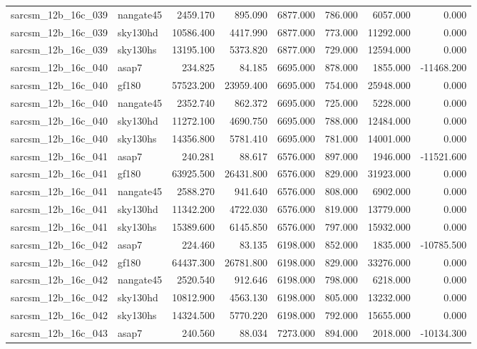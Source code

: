 \begin{tabular}{llrrrrrr}
sarcsm\_12b\_16c\_039 & nangate45 & 2459.170 & 895.090 & 6877.000 & 786.000 & 6057.000 & 0.000 \\
sarcsm\_12b\_16c\_039 & sky130hd & 10586.400 & 4417.990 & 6877.000 & 773.000 & 11292.000 & 0.000 \\
sarcsm\_12b\_16c\_039 & sky130hs & 13195.100 & 5373.820 & 6877.000 & 729.000 & 12594.000 & 0.000 \\
sarcsm\_12b\_16c\_040 & asap7 & 234.825 & 84.185 & 6695.000 & 878.000 & 1855.000 & -11468.200 \\
sarcsm\_12b\_16c\_040 & gf180 & 57523.200 & 23959.400 & 6695.000 & 754.000 & 25948.000 & 0.000 \\
sarcsm\_12b\_16c\_040 & nangate45 & 2352.740 & 862.372 & 6695.000 & 725.000 & 5228.000 & 0.000 \\
sarcsm\_12b\_16c\_040 & sky130hd & 11272.100 & 4690.750 & 6695.000 & 788.000 & 12484.000 & 0.000 \\
sarcsm\_12b\_16c\_040 & sky130hs & 14356.800 & 5781.410 & 6695.000 & 781.000 & 14001.000 & 0.000 \\
sarcsm\_12b\_16c\_041 & asap7 & 240.281 & 88.617 & 6576.000 & 897.000 & 1946.000 & -11521.600 \\
sarcsm\_12b\_16c\_041 & gf180 & 63925.500 & 26431.800 & 6576.000 & 829.000 & 31923.000 & 0.000 \\
sarcsm\_12b\_16c\_041 & nangate45 & 2588.270 & 941.640 & 6576.000 & 808.000 & 6902.000 & 0.000 \\
sarcsm\_12b\_16c\_041 & sky130hd & 11342.200 & 4722.030 & 6576.000 & 819.000 & 13779.000 & 0.000 \\
sarcsm\_12b\_16c\_041 & sky130hs & 15389.600 & 6145.850 & 6576.000 & 797.000 & 15932.000 & 0.000 \\
sarcsm\_12b\_16c\_042 & asap7 & 224.460 & 83.135 & 6198.000 & 852.000 & 1835.000 & -10785.500 \\
sarcsm\_12b\_16c\_042 & gf180 & 64437.300 & 26781.800 & 6198.000 & 829.000 & 33276.000 & 0.000 \\
sarcsm\_12b\_16c\_042 & nangate45 & 2520.540 & 912.646 & 6198.000 & 798.000 & 6218.000 & 0.000 \\
sarcsm\_12b\_16c\_042 & sky130hd & 10812.900 & 4563.130 & 6198.000 & 805.000 & 13232.000 & 0.000 \\
sarcsm\_12b\_16c\_042 & sky130hs & 14324.500 & 5770.220 & 6198.000 & 792.000 & 15655.000 & 0.000 \\
sarcsm\_12b\_16c\_043 & asap7 & 240.560 & 88.034 & 7273.000 & 894.000 & 2018.000 & -10134.300 \\

\end{tabular}

